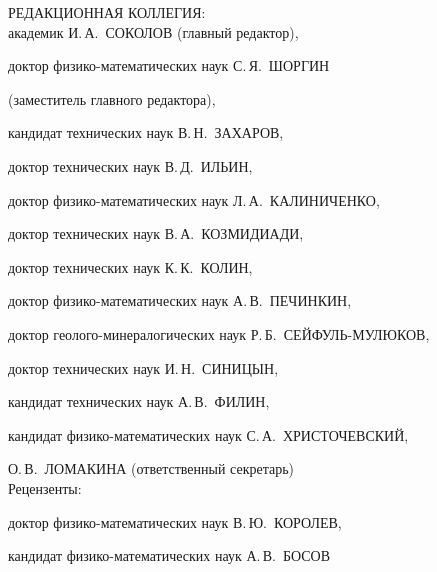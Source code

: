 \documentclass[11pt]{book}
\begin{document}
{\scriptsize


\begin{center}


{РЕДАКЦИОННАЯ КОЛЛЕГИЯ:}\\





академик И.\,А.~СОКОЛОВ (главный редактор),





доктор физико-математических наук С.\,Я.~ШОРГИН





 (заместитель главного редактора),





кандидат технических наук В.\,Н.~ЗАХАРОВ,





доктор технических наук  В.\,Д.~ИЛЬИН,





доктор физико-математических наук Л.\,А.~КАЛИНИЧЕНКО,





доктор технических наук В.\,А.~КОЗМИДИАДИ,





доктор технических наук К.\,К.~КОЛИН,





доктор физико-математических наук А.\,В.~ПЕЧИНКИН,





доктор  геолого-минералогических наук Р.\,Б.~СЕЙФУЛЬ-МУЛЮКОВ,





доктор технических наук  И.\,Н.~СИНИЦЫН,





кандидат технических наук А.\,В.~ФИЛИН,





кандидат физико-математических наук С.\,А.~ХРИСТОЧЕВСКИЙ,





О.\,В.~ЛОМАКИНА (ответственный секретарь)\\[1mm]





            {Рецензенты:}





доктор физико-математических наук   В.\,Ю.~КОРОЛЕВ,





кандидат физико-математических наук А.\,В.~БОСОВ


\end{center}


}
\end{document}
